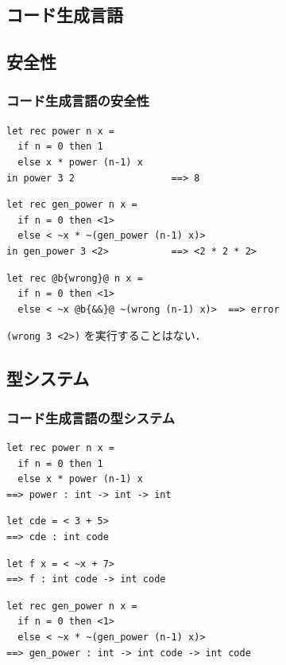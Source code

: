 \documentclass[dvipdfmx,cjk,xcolor=dvipsnames,envcountsect,notheorems,12pt]{beamer}
\theoremstyle{definition}
\begin{document}
\begin{appendix}


  \section{コード生成言語}
  \subsection{安全性}

\begin{frame}[fragile]
  \frametitle{コード生成言語の安全性}
\begin{lstlisting}
let rec power n x =
  if n = 0 then 1
  else x * power (n-1) x
in power 3 2                 ==> 8
\end{lstlisting}
\begin{lstlisting}
let rec gen_power n x =
  if n = 0 then <1>
  else < ~x * ~(gen_power (n-1) x)>
in gen_power 3 <2>           ==> <2 * 2 * 2>
\end{lstlisting}
\begin{lstlisting}
let rec @b{wrong}@ n x =
  if n = 0 then <1>
  else < ~x @b{&&}@ ~(wrong (n-1) x)>  ==> error
\end{lstlisting}
  \texttt{(wrong 3 <2>)} を実行することはない．
\end{frame}

\subsection{型システム}

\begin{frame}[fragile]
  \frametitle{コード生成言語の型システム}
\begin{lstlisting}
let rec power n x =
  if n = 0 then 1
  else x * power (n-1) x
==> power : int -> int -> int
\end{lstlisting}
\begin{lstlisting}
let cde = < 3 + 5>
==> cde : int code
\end{lstlisting}
\begin{lstlisting}
let f x = < ~x + 7>
==> f : int code -> int code
\end{lstlisting}
\begin{lstlisting}
let rec gen_power n x =
  if n = 0 then <1>
  else < ~x * ~(gen_power (n-1) x)>
==> gen_power : int -> int code -> int code
\end{lstlisting}


\end{frame}
\end{appendix}
\end{document}
